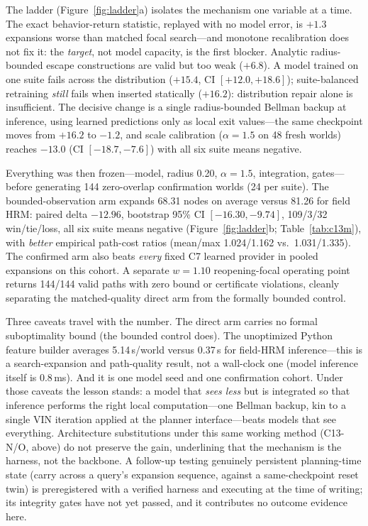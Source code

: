 \documentclass[letterpaper]{article} %
\newcommand{\stage}[1]{\textsc{#1}}
\begin{document}
The ladder (Figure~\ref{fig:ladder}a) isolates the mechanism one variable at a time. The exact behavior-return statistic, replayed with no model error, is $+1.3$ expansions worse than matched focal search---and monotone recalibration does not fix it: the \emph{target}, not model capacity, is the first blocker. Analytic radius-bounded escape constructions are valid but too weak ($+6.8$). A model trained on one suite fails across the distribution ($+15.4$, CI $[+12.0,+18.6]$); suite-balanced retraining \emph{still} fails when inserted statically ($+16.2$): distribution repair alone is insufficient. The decisive change is a single radius-bounded Bellman backup at inference, using learned predictions only as local exit values---the same checkpoint moves from $+16.2$ to $-1.2$, and scale calibration ($\alpha{=}1.5$ on 48 fresh worlds) reaches $-13.0$ (CI $[-18.7,-7.6]$) with all six suite means negative.

Everything was then frozen---model, radius 0.20, $\alpha{=}1.5$, integration, gates---before generating 144 zero-overlap confirmation worlds (24 per suite). The bounded-observation arm expands 68.31 nodes on average versus 81.26 for field HRM: paired delta $-12.96$, bootstrap 95\% CI $[-16.30, -9.74]$, 109/3/32 win/tie/loss, all six suite means negative (Figure~\ref{fig:ladder}b; Table~\ref{tab:c13m}), with \emph{better} empirical path-cost ratios (mean/max 1.024/1.162 vs.\ 1.031/1.335). The confirmed arm also beats \emph{every} fixed \stage{C7} learned provider in pooled expansions on this cohort. A separate $w{=}1.10$ reopening-focal operating point returns 144/144 valid paths with zero bound or certificate violations, cleanly separating the matched-quality direct arm from the formally bounded control.

Three caveats travel with the number. The direct arm carries no formal suboptimality bound (the bounded control does). The unoptimized Python feature builder averages 5.14\,s/world versus 0.37\,s for field-HRM inference---this is a search-expansion and path-quality result, not a wall-clock one (model inference itself is 0.8\,ms). And it is one model seed and one confirmation cohort. Under those caveats the lesson stands: a model that \emph{sees less} but is integrated so that inference performs the right local computation---one Bellman backup, kin to a single VIN iteration \citep{tamar2016vin} applied at the planner interface---beats models that see everything. Architecture substitutions under this same working method (\stage{C13-N/O}, above) do not preserve the gain, underlining that the mechanism is the harness, not the backbone. A follow-up testing genuinely persistent planning-time state (carry across a query's expansion sequence, against a same-checkpoint reset twin) is preregistered with a verified harness and executing at the time of writing; its integrity gates have not yet passed, and it contributes no outcome evidence here.
\end{document}
